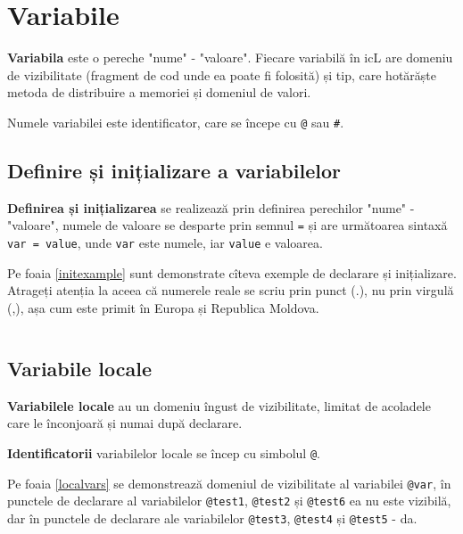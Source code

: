 \section{Variabile}

\textbf{Variabila} este o pereche "nume" - "valoare". Fiecare variabilă în icL are domeniu de vizibilitate (fragment de cod unde ea poate fi folosită) și tip, care hotărăște metoda de distribuire a memoriei și domeniul de valori.

Numele variabilei este identificator, care se începe cu \texttt{@} sau {\color{blue2}\texttt{#}}. 

\subsection{Definire și inițializare a variabilelor}

\textbf{Definirea și inițializarea} se realizează prin definirea perechilor "nume" - "valoare", numele de valoare se desparte prin semnul \texttt{=} și are următoarea sintaxă \texttt{var = value}, unde \texttt{var} este numele, iar \texttt{value} e valoarea.

Pe foaia \ref{initexample} sunt demonstrate cîteva exemple de declarare și inițializare. Atrageți atenția la aceea că numerele reale se scriu prin punct (.), nu prin virgulă (,), așa cum este primit în Europa și Republica Moldova.

\begin{sourcecode}
    \label{initexample}
    \inputminted[linenos]{icl}{../sources/initexample.icL}
\end{sourcecode}

\subsection{Variabile locale}

\textbf{Variabilele locale} au un domeniu îngust de vizibilitate, limitat de acoladele care le înconjoară și numai după declarare.

{\bf Identificatorii} variabilelor locale se încep cu simbolul \texttt{@}.

Pe foaia \ref{localvars} se demonstrează domeniul de vizibilitate al variabilei \texttt{@var}, în punctele de declarare al variabilelor \texttt{@test1}, \texttt{@test2} și \texttt{@test6} ea nu este vizibilă, dar în punctele de declarare ale variabilelor \texttt{@test3}, \texttt{@test4} și \texttt{@test5} - da.

